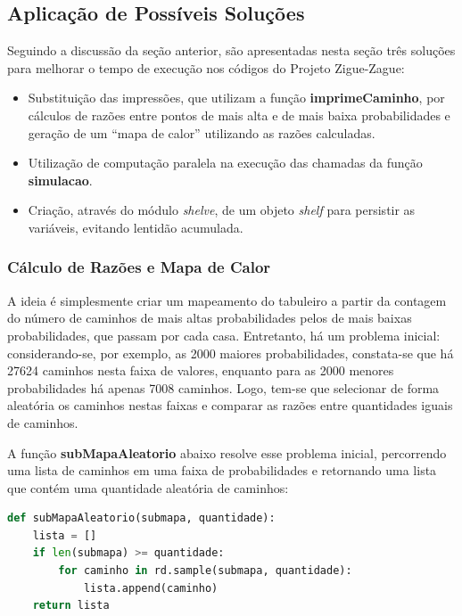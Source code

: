 \documentclass[12pt]{article}
\newcommand{\aspas}[1]{``#1''} %
\begin{document}
\subsection{Aplicação de Possíveis Soluções}
\label{solucoes}


Seguindo a discussão da seção anterior, são apresentadas nesta seção três soluções para melhorar o tempo de execução nos códigos do Projeto Zigue-Zague:

\begin{itemize}
	\item Substituição das impressões, que utilizam a função \textbf{imprimeCaminho}, por cálculos de razões entre pontos de mais alta e de mais baixa probabilidades e geração de um \aspas{mapa de calor} utilizando as razões calculadas.
	\item Utilização de computação paralela na execução das chamadas da função \textbf{simulacao}.
	\item Criação, através do módulo \textit{shelve}, de um objeto \textit{shelf} para persistir as variáveis, evitando lentidão acumulada. 
\end{itemize}

\subsubsection{Cálculo de Razões e Mapa de Calor}
\label{mapas_calor}

A ideia é simplesmente criar um mapeamento do tabuleiro a partir da contagem do número de caminhos de mais altas probabilidades pelos de mais baixas probabilidades, que passam por cada casa. Entretanto, há um problema inicial: considerando-se, por exemplo, as 2000 maiores probabilidades, constata-se que há 27624 caminhos nesta faixa de valores, enquanto para as 2000 menores probabilidades há apenas 7008 caminhos. Logo, tem-se que selecionar de forma aleatória os caminhos nestas faixas e comparar as razões entre quantidades iguais de caminhos.

A função \textbf{subMapaAleatorio} abaixo resolve esse problema inicial, percorrendo uma lista de caminhos em uma faixa de probabilidades e retornando uma lista que contém uma quantidade aleatória de caminhos:

\begin{lstlisting}[language=Python]
def subMapaAleatorio(submapa, quantidade):
	lista = []
	if len(submapa) >= quantidade:
		for caminho in rd.sample(submapa, quantidade):
			lista.append(caminho)
	return lista
\end{lstlisting}
\end{document}
